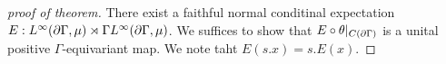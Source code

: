 \begin{proof}[proof of theorem]
  There exist a faithful normal conditinal expectation $E : L^\infty(\frak{\partial} \Gamma, \mu) \rtimes \Gamma L^\infty(\frak{\partial} \Gamma, \mu)$.
  We suffices to show that $E \circ \theta|_{C(\frak{\partial} \Gamma)}$ is a unital positive $\Gamma$-equivariant map.
  We note taht $E(s. x) = s. E(x)$.
\end{proof}
